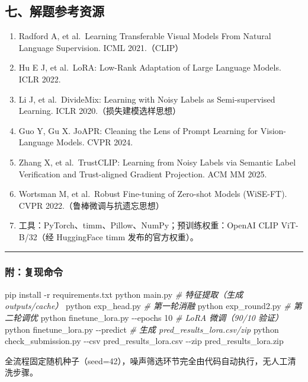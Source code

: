 \documentclass[
]{article}
\newenvironment{Shaded}{}{}
\newcommand{\AttributeTok}[1]{\textcolor[rgb]{0.49,0.56,0.16}{#1}}
\newcommand{\CommentTok}[1]{\textcolor[rgb]{0.38,0.63,0.69}{\textit{#1}}}
\newcommand{\ExtensionTok}[1]{#1}
\newcommand{\NormalTok}[1]{#1}
\providecommand{\tightlist}{%
  \setlength{\itemsep}{0pt}\setlength{\parskip}{0pt}}
\begin{document}
\subsection{七、解题参考资源}\label{ux4e03ux89e3ux9898ux53c2ux8003ux8d44ux6e90}

\begin{enumerate}
\def\labelenumi{\arabic{enumi}.}
\tightlist
\item
  Radford A, et al.~Learning Transferable Visual Models From Natural
  Language Supervision. ICML 2021.（CLIP）
\item
  Hu E J, et al.~LoRA: Low-Rank Adaptation of Large Language Models.
  ICLR 2022.
\item
  Li J, et al.~DivideMix: Learning with Noisy Labels as Semi-supervised
  Learning. ICLR 2020.（损失建模选样思想）
\item
  Guo Y, Gu X. JoAPR: Cleaning the Lens of Prompt Learning for
  Vision-Language Models. CVPR 2024.
\item
  Zhang X, et al.~TrustCLIP: Learning from Noisy Labels via Semantic
  Label Verification and Trust-aligned Gradient Projection. ACM MM 2025.
\item
  Wortsman M, et al.~Robust Fine-tuning of Zero-shot Models (WiSE-FT).
  CVPR 2022.（鲁棒微调与抗遗忘思想）
\item
  工具：PyTorch、timm、Pillow、NumPy；预训练权重：OpenAI CLIP
  ViT-B/32（经 HuggingFace timm 发布的官方权重）。
\end{enumerate}

\begin{center}\rule{0.5\linewidth}{0.5pt}\end{center}

\subsubsection{附：复现命令}\label{ux9644ux590dux73b0ux547dux4ee4}

\begin{Shaded}
\begin{Highlighting}[]
\ExtensionTok{pip}\NormalTok{ install }\AttributeTok{{-}r}\NormalTok{ requirements.txt}
\ExtensionTok{python}\NormalTok{ main.py                                   }\CommentTok{\# 特征提取（生成 outputs/cache）}
\ExtensionTok{python}\NormalTok{ exp\_head.py                               }\CommentTok{\# 第一轮消融}
\ExtensionTok{python}\NormalTok{ exp\_round2.py                             }\CommentTok{\# 第二轮调优}
\ExtensionTok{python}\NormalTok{ finetune\_lora.py }\AttributeTok{{-}{-}epochs}\NormalTok{ 10              }\CommentTok{\# LoRA 微调（90/10 验证）}
\ExtensionTok{python}\NormalTok{ finetune\_lora.py }\AttributeTok{{-}{-}predict}                \CommentTok{\# 生成 pred\_results\_lora.csv/zip}
\ExtensionTok{python}\NormalTok{ check\_submission.py }\AttributeTok{{-}{-}csv}\NormalTok{ pred\_results\_lora.csv }\AttributeTok{{-}{-}zip}\NormalTok{ pred\_results\_lora.zip}
\end{Highlighting}
\end{Shaded}

全流程固定随机种子（seed=42），噪声筛选环节完全由代码自动执行，无人工清洗步骤。
\end{document}
